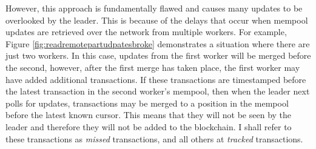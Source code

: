\documentclass[12pt,a4paper,twoside,openright]{report}
\begin{document}
			However, this approach is fundamentally flawed and causes many updates to be overlooked by the leader. 
			This is because of the delays that occur when mempool updates are retrieved over the network from multiple workers.
			For example, Figure \ref{fig:readremotepartudpatesbroke} demonstrates a situation where there are just two workers. 
			In this case, updates from the first worker will be merged before the second, however, after the first merge has taken place, the first worker may have added additional transactions. 
			If these transactions are timestamped before the latest transaction in the second worker's mempool, then when the leader next polls for updates, transactions may be merged to a position in the mempool before the latest known cursor. 
			This means that they will not be seen by the leader and therefore they will not be added to the blockchain. 
			I shall refer to these transactions as \textit{missed} transactions, and all others at \textit{tracked} transactions.\\
\end{document}

